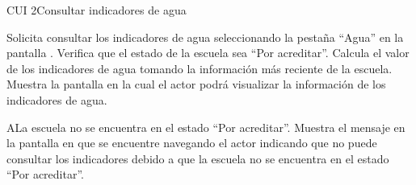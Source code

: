 \begin{UseCase}{CUI 2}{Consultar indicadores de agua}
{	}
	



	

	
\end{UseCase}
 \begin{UCtrayectoria}
    \UCpaso[\UCactor] Solicita consultar los indicadores de agua seleccionando la pestaña ``Agua'' en la pantalla .
    \UCpaso[\UCsist] Verifica que el estado de la escuela sea ``Por acreditar''. 
    \UCpaso[\UCsist] Calcula el valor de los indicadores de  agua tomando la información más reciente de la escuela.%
    \UCpaso[\UCsist] Muestra la pantalla  en la cual el actor podrá visualizar la información de los indicadores de agua.
\end{UCtrayectoria}
 

 \begin{UCtrayectoriaA}{A}{La escuela no se encuentra en el estado ``Por acreditar''.}
    \UCpaso[\UCsist] Muestra el mensaje  en la pantalla en que se encuentre navegando el
    actor indicando que no puede consultar los indicadores debido a que la escuela no se encuentra en el estado ``Por acreditar''. 
 \end{UCtrayectoriaA}
 
